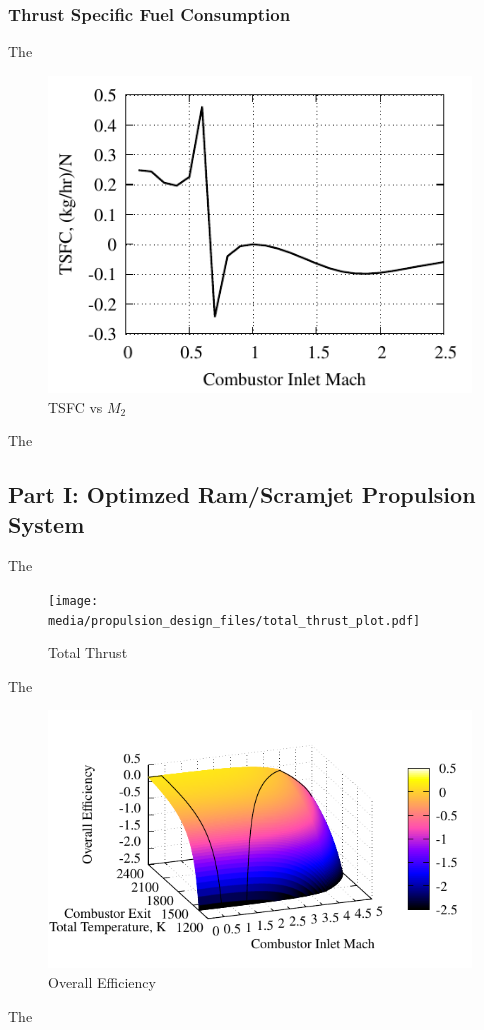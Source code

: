 \documentclass[conf]{new-aiaa} %
\begin{document}
\subsubsection{Thrust Specific Fuel Consumption}
The

\begin{figure}[hbt!] %
    \centering
    \includegraphics[]{media/performance_parameter_files/part_h_TSFC.pdf}
    \caption{\label{fig:parthtsfc}TSFC vs \texorpdfstring{\textit{$M_2$}}{M2}}
\end{figure}
The

\subsection{Part I: Optimzed Ram/Scramjet Propulsion System}
The

\begin{figure}[hbt!] %
    \centering
    \texttt{[image: media/propulsion\_design\_files/total\_thrust\_plot.pdf]}
    \caption{\label{fig:partithrust}Total Thrust}
\end{figure}
The

\begin{figure}[hbt!] %
    \centering
    \includegraphics[]{media/propulsion_design_files/eta_o_plot.pdf}
    \caption{\label{fig:partietao}Overall Efficiency}
\end{figure}
The
\end{document}
